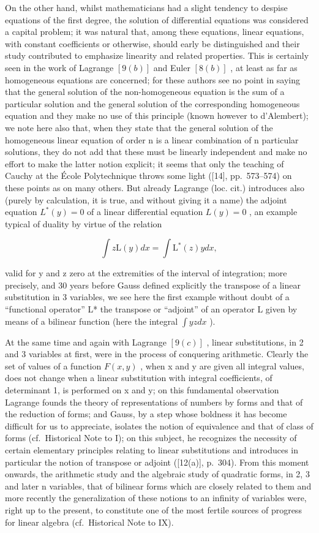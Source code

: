 On the other hand, whilst mathematicians had a slight tendency to despise equations of the first degree, the solution of differential equations was considered a capital problem; it was natural that, among these equations, linear equations, with constant coefficients or otherwise, should early be distinguished and their study contributed to emphasize linearity and related properties. This is certainly seen in the work of Lagrange \([9(b)]\) and Euler \([8(b)]\) , at least as far as homogeneous equations are concerned; for these authors see no point in saying that the general solution of the non-homogeneous equation is the sum of a particular solution and the general solution of the corresponding homogeneous equation and they make no use of this principle (known however to d'Alembert); we note here also that, when they state that the general solution of the homogeneous linear equation of order n is a linear combination of n particular solutions, they do not add that these must be linearly independent and make no effort to make the latter notion explicit; it seems that only the teaching of Cauchy at the École Polytechnique throws some light ({[}14{]}, pp.~573--574) on these points as on many others. But already Lagrange (loc. cit.) introduces also (purely by calculation, it is true, and without giving it a name) the adjoint equation \(L^{*}(y)=0\) of a linear differential equation \(L(y)=0\) , an example typical of duality by virtue of the relation

\[
\int z \mathrm{L} (y) d x = \int \mathrm{L} ^ {*} (z) y d x,
\]

valid for y and z zero at the extremities of the interval of integration; more precisely, and 30 years before Gauss defined explicitly the transpose of a linear substitution in 3 variables, we see here the first example without doubt of a ``functional operator'' L* the transpose or ``adjoint'' of an operator L given by means of a bilinear function (here the integral \(\int yz dx\) ).

At the same time and again with Lagrange \([9(c)]\) , linear substitutions, in 2 and 3 variables at first, were in the process of conquering arithmetic. Clearly the set of values of a function \(F(x,y)\) , when x and y are given all integral values, does not change when a linear substitution with integral coefficients, of determinant 1, is performed on x and y; on this fundamental observation Lagrange founds the theory of representations of numbers by forms and that of the reduction of forms; and Gauss, by a step whose boldness it has become difficult for us to appreciate, isolates the notion of equivalence and that of class of forms (cf.~Historical Note to I); on this subject, he recognizes the necessity of certain elementary principles relating to linear substitutions and introduces in particular the notion of transpose or adjoint ({[}12(a){]}, p.~304). From this moment onwards, the arithmetic study and the algebraic study of quadratic forms, in 2, 3 and later n variables, that of bilinear forms which are closely related to them and more recently the generalization of these notions to an infinity of variables were, right up to the present, to constitute one of the most fertile sources of progress for linear algebra (cf.~Historical Note to IX).

